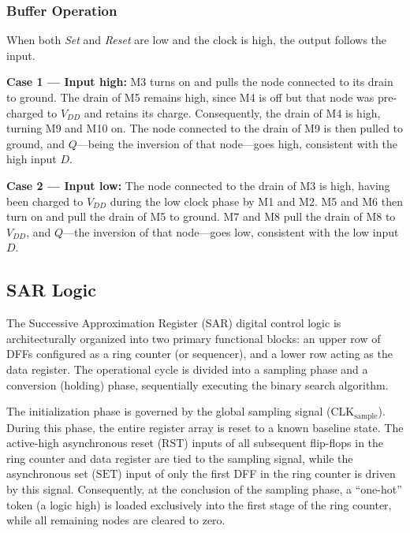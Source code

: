 \subsubsection{Buffer Operation}

When both \textit{Set} and \textit{Reset} are low and the clock is high, the output follows
the input.

\textbf{Case 1 --- Input high:} M3 turns on and pulls the node connected to its drain to
ground. The drain of M5 remains high, since M4 is off but that node was pre-charged to
$V_{DD}$ and retains its charge. Consequently, the drain of M4 is high, turning M9 and M10
on. The node connected to the drain of M9 is then pulled to ground, and $Q$---being the
inversion of that node---goes high, consistent with the high input $D$.

\textbf{Case 2 --- Input low:} The node connected to the drain of M3 is high, having been
charged to $V_{DD}$ during the low clock phase by M1 and M2. M5 and M6 then turn on and pull
the drain of M5 to ground. M7 and M8 pull the drain of M8 to $V_{DD}$, and $Q$---the
inversion of that node---goes low, consistent with the low input $D$.

\subsection{SAR Logic}

The Successive Approximation Register (SAR) digital control logic is architecturally organized
into two primary functional blocks: an upper row of DFFs configured as a ring counter (or
sequencer), and a lower row acting as the data register. The operational cycle is divided into
a sampling phase and a conversion (holding) phase, sequentially executing the binary search
algorithm.

The initialization phase is governed by the global sampling signal
($\mathrm{CLK}_{\mathrm{sample}}$). During this phase, the entire register array is reset to a
known baseline state. The active-high asynchronous reset ($\mathrm{RST}$) inputs of all
subsequent flip-flops in the ring counter and data register are tied to the sampling signal,
while the asynchronous set ($\mathrm{SET}$) input of only the first DFF in the ring counter is
driven by this signal. Consequently, at the conclusion of the sampling phase, a ``one-hot''
token (a logic high) is loaded exclusively into the first stage of the ring counter, while all
remaining nodes are cleared to zero.


